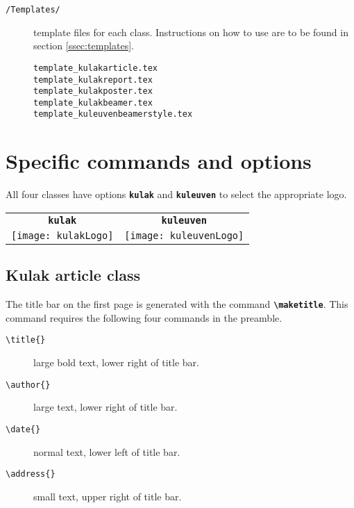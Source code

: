 \documentclass[a4paper,kulak]{kulakarticle} %
\begin{document}
\begin{description}
\begin{description}
\end{description}
\item[\texttt{/Templates/}] template files for each class. Instructions on how to use are to be found in section \ref{ssec:templates}.
\begin{description}
\item[\texttt{template\_kulakarticle.tex}]
\item[\texttt{template\_kulakreport.tex}]
\item[\texttt{template\_kulakposter.tex}]  
\item[\texttt{template\_kulakbeamer.tex}]  
\item[\texttt{template\_kuleuvenbeamerstyle.tex}] 
\end{description}
\end{description}

\section{Specific commands and options}
All four classes have options \textbf{\texttt{kulak}} and \textbf{\texttt{kuleuven}} to select the appropriate logo.
\begin{center}
\begin{tabular}{c|c}
\textbf{\texttt{kulak}} & \textbf{\texttt{kuleuven}}\\
\texttt{[image: kulakLogo]} & \texttt{[image: kuleuvenLogo]} 
\end{tabular}
\end{center}

\subsection{Kulak article class}

The title bar on the first page is generated with the command \textbf{\texttt{\textbackslash maketitle}}. This command requires the following four commands in the preamble.
\begin{description}
\item[\texttt{\textbackslash title\{\}}] large bold text, lower right of title bar.
\item[\texttt{\textbackslash author\{\}}] large text, lower right of title bar.
\item[\texttt{\textbackslash date\{\}}] normal text, lower left of title bar.
\item[\texttt{\textbackslash address\{\}}] small text, upper right of title bar.
\end{description}
\end{document}
